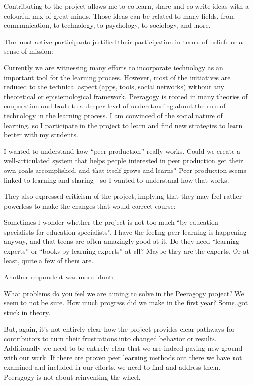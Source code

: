 \documentclass[twoside]{article}
\begin{document}
\begin{multicols}{2}
Contributing to the project allows me to co-learn, share and co-write ideas with a colourful mix of great minds. Those ideas can be related to many fields, from communication, to technology, to psychology, to sociology, and more.

The most active participants justified their participation in terms of beliefs or a sense of mission:

Currently we are witnessing many efforts to incorporate technology as an important tool for the learning process. However, most of the initiatives are reduced to the technical aspect (apps, tools, social networks) without any theoretical or epistemological framework. Peeragogy is rooted in many theories of cooperation and leads to a deeper level of understanding about the role of technology in the learning process. I am convinced of the social nature of learning, so I participate in the project to learn and find new strategies to learn better with my students.

I wanted to understand how ``peer production'' really works. Could we create a well-articulated system that helps people interested in peer production get their own goals accomplished, and that itself grows and learns? Peer production seems linked to learning and sharing - so I wanted to understand how that works.

They also expressed criticism of the project, implying that they may feel rather powerless to make the changes that would correct course:

Sometimes I wonder whether the project is not too much ``by education specialists for education specialists''. I have the feeling peer learning is happening anyway, and that teens are often amazingly good at it. Do they need ``learning experts'' or ``books by learning experts'' at all? Maybe they are the experts. Or at least, quite a few of them are.

Another respondent was more blunt:

What problems do you feel we are aiming to solve in the Peeragogy project? We seem to not be sure. How much progress did we make in the first year? Some..got stuck in theory.

But, again, it's not entirely clear how the project provides clear pathways for contributors to turn their frustrations into changed behavior or results. Additionally we need to be entirely clear that we are indeed paving new ground with our work. If there are proven peer learning methods out there we have not examined and included in our efforts, we need to find and address them. Peeragogy is not about reinventing the wheel.


\end{multicols}
\end{document}
